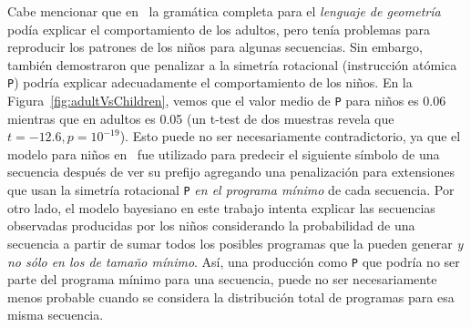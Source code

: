 
Cabe mencionar que en~\cite{amalric2017language} la gramática completa para el \textit{lenguaje de geometría} podía explicar el comportamiento de los adultos, pero tenía problemas para reproducir los patrones de los niños para algunas secuencias. Sin embargo, también demostraron que penalizar a la simetría rotacional (instrucción atómica \verb#P#)  podría explicar adecuadamente el comportamiento de los niños. En la Figura~\ref{fig:adultVsChildren}, vemos que el valor medio de \verb#P# para niños es 0.06 mientras que en adultos es 0.05 (un t-test de dos muestras revela que $t = -12.6, p = 10^{-19}$). Esto puede no ser necesariamente contradictorio, ya que el modelo para niños en~\cite{amalric2017language} fue utilizado para predecir el siguiente símbolo de una secuencia después de ver su prefijo agregando una penalización para extensiones que usan la simetría rotacional \verb#P# \textit{en el programa mínimo} de cada secuencia. Por otro lado, el modelo bayesiano en este trabajo intenta explicar las secuencias observadas producidas por los niños considerando la probabilidad de una secuencia a partir de sumar todos los posibles programas que la pueden generar \textit{y no sólo en los de tamaño mínimo}. Así, una producción como \verb#P# que podría no ser parte del programa mínimo para una secuencia, puede no ser necesariamente menos probable cuando se considera la distribución total de programas para esa misma secuencia.

